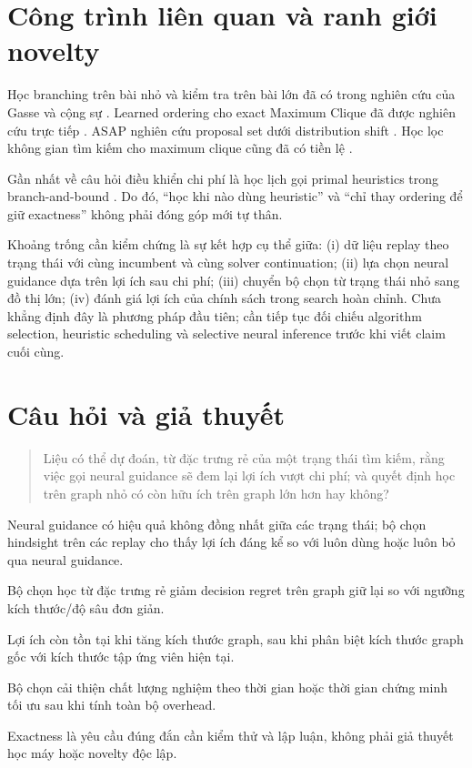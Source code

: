 \documentclass[11pt,a4paper]{article}
\begin{document}
\section{Công trình liên quan và ranh giới novelty}
Học branching trên bài nhỏ và kiểm tra trên bài lớn đã có trong nghiên cứu của Gasse và cộng sự \citep{gasse2019}. Learned ordering cho exact Maximum Clique đã được nghiên cứu trực tiếp \citep{min2025ordering}. ASAP nghiên cứu proposal set dưới distribution shift \citep{fang2026asap}. Học lọc không gian tìm kiếm cho maximum clique cũng đã có tiền lệ \citep{lauri2019}.

Gần nhất về câu hỏi điều khiển chi phí là học lịch gọi primal heuristics trong branch-and-bound \citep{chmiela2021}. Do đó, ``học khi nào dùng heuristic'' và ``chỉ thay ordering để giữ exactness'' không phải đóng góp mới tự thân.

Khoảng trống cần kiểm chứng là sự kết hợp cụ thể giữa: (i) dữ liệu replay theo trạng thái với cùng incumbent và cùng solver continuation; (ii) lựa chọn neural guidance dựa trên lợi ích sau chi phí; (iii) chuyển bộ chọn từ trạng thái nhỏ sang đồ thị lớn; (iv) đánh giá lợi ích của chính sách trong search hoàn chỉnh. Chưa khẳng định đây là phương pháp đầu tiên; cần tiếp tục đối chiếu algorithm selection, heuristic scheduling và selective neural inference trước khi viết claim cuối cùng.

\section{Câu hỏi và giả thuyết}
\begin{quote}
Liệu có thể dự đoán, từ đặc trưng rẻ của một trạng thái tìm kiếm, rằng việc gọi neural guidance sẽ đem lại lợi ích vượt chi phí; và quyết định học trên graph nhỏ có còn hữu ích trên graph lớn hơn hay không?
\end{quote}
\begin{description}[style=nextline]
\item[H1: Dư địa cải thiện.] Neural guidance có hiệu quả không đồng nhất giữa các trạng thái; bộ chọn hindsight trên các replay cho thấy lợi ích đáng kể so với luôn dùng hoặc luôn bỏ qua neural guidance.
\item[H2: Khả năng dự đoán.] Bộ chọn học từ đặc trưng rẻ giảm decision regret trên graph giữ lại so với ngưỡng kích thước/độ sâu đơn giản.
\item[H3: Small-to-large.] Lợi ích còn tồn tại khi tăng kích thước graph, sau khi phân biệt kích thước graph gốc với kích thước tập ứng viên hiện tại.
\item[H4: Hiệu quả end-to-end.] Bộ chọn cải thiện chất lượng nghiệm theo thời gian hoặc thời gian chứng minh tối ưu sau khi tính toàn bộ overhead.
\end{description}
Exactness là yêu cầu đúng đắn cần kiểm thử và lập luận, không phải giả thuyết học máy hoặc novelty độc lập.
\end{document}
